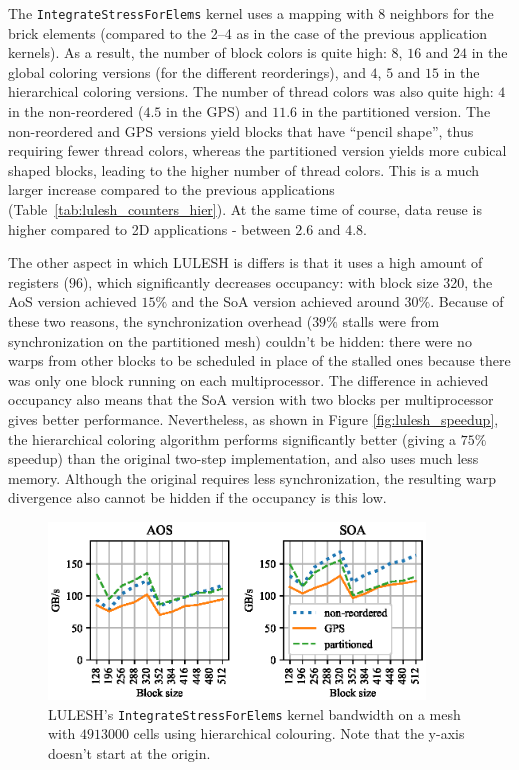 The \texttt{IntegrateStressForElems} kernel uses a mapping with 8 neighbors for 
the brick elements (compared to the 2--4 as in the case of the previous 
application kernels). As a result, the number of block colors is quite high: $8$, $16$ 
and $24$ in the global coloring versions (for the different reorderings), and 
$4$, $5$ and $15$ in the hierarchical coloring versions. The number of thread 
colors was also quite high: $4$ in the non-reordered ($4.5$ in the GPS) and 
$11.6$ in the partitioned version. The non-reordered and GPS versions yield 
blocks that have ``pencil shape'', thus requiring fewer thread colors, whereas 
the partitioned version yields more cubical shaped blocks, leading to the higher 
number of thread colors. This is a much larger increase compared to the previous 
applications (Table~\ref{tab:lulesh_counters_hier}). At the same time of course, 
data reuse is higher compared to 2D applications - between $2.6$ and $4.8$.

The other aspect in which LULESH is differs is that it uses a high amount of
registers ($96$), which significantly decreases occupancy: with block size 320, 
the AoS version achieved $15\%$ and the SoA version achieved around $30\%$. 
Because of these two reasons, the synchronization overhead ($39\%$ stalls were 
from synchronization on the partitioned mesh) couldn't be hidden: there were no 
warps from other blocks to be scheduled in place of the stalled ones because
there was only one block running on each multiprocessor. The difference in 
achieved occupancy also means that the SoA version with two blocks 
per multiprocessor gives better performance. Nevertheless, as shown in Figure 
\ref{fig:lulesh_speedup}, the hierarchical coloring algorithm performs 
significantly better (giving a $75\%$ speedup) than the original two-step 
implementation, and also uses much less memory. Although the original requires 
less synchronization, the resulting warp divergence also cannot be hidden if the 
occupancy is this low.
 
\begin{figure}[Htbp]
\centering
\includegraphics[width=10cm]{fig/lulesh_bw-vs-bs_hier.eps}
\caption{LULESH's \texttt{IntegrateStressForElems} kernel bandwidth on a mesh 
with $4913000$ cells using hierarchical colouring. Note that the y-axis 
doesn't start at the origin.}
  \label{fig:lulesh_bw-vs-bs_hier}
\end{figure}

